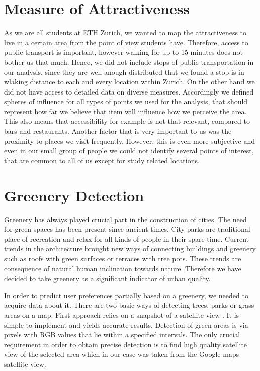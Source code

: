 \documentclass[letterpaper]{article}
\begin{document}
\section{Measure of Attractiveness}\label{sec:attractiveness}
As we are all students at ETH Zurich, we wanted to map the attractiveness to live in a certain area from the point of view students have. 
Therefore, access to public transport is important, however walking for up to 15 minutes does not bother us that much. Hence, we did not 
include stops of public transportation in our analysis, since they are well anough distributed that we found a stop is in wlaking distance 
to each and every location within Zurich.
On the other hand we did not have access to detailed data on diverse measures. Accordingly we defined spheres of influence for all types 
of points we used for the analysis, that should represent how far we believe that item will influence how we perceive the area.
This also means that accessibility for example is not that relevant, compared to bars and restaurants. Another factor that is 
very important to us was the proximity to places we visit frequently. However, this is even more subjective and even in our 
small group of people we could not identify several points of interest, that are common to all of us except for study related locations.

\section{Greenery Detection}\label{sec:greenery}
\indent Greenery has always played crucial part in the construction of cities. The need for green spaces has been present since ancient times.
City parks are traditional place of recreation and relax for all kinds of people in their spare time. Current trends in the architecture brought new ways of
connecting buildings and greenery such as roofs with green surfaces or terraces with tree pots. These trends are consequence of natural 
human inclination towards nature. Therefore we have decided to take greenery as a significant indicator of urban quality.

\indent In order to predict user preferences partially based on a greenery, we needed to acquire data about it. There are two basic ways of detecting trees, 
parks or grass areas on a map. First approach relies on a snapshot of a satellite view \cite{smartCities}. It is simple to implement and yields accurate results. 
Detection of green areas is via pixels with RGB values that lie within a specified intervals. The only crucial requirement in order to obtain precise detection 
is to find high quality satellite view of the selected area which in our case was taken from the Google maps satellite view.
\end{document}

